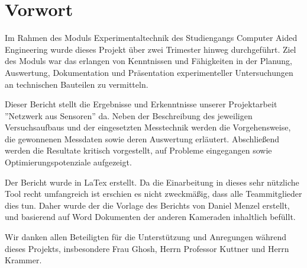 
\chapter*{Vorwort}
\thispagestyle{empty} %
\todo{}

Im Rahmen des Moduls Experimentaltechnik des Studiengangs Computer Aided Engineering wurde dieses Projekt über zwei Trimester hinweg durchgeführt.
Ziel des Moduls war das erlangen von Kenntnissen und Fähigkeiten in der Planung, Auswertung, Dokumentation und Präsentation experimenteller Untersuchungen an technischen Bauteilen zu vermitteln.

Dieser Bericht stellt die Ergebnisse und Erkenntnisse unserer Projektarbeit ''Netzwerk aus Sensoren'' da.
Neben der Beschreibung des jeweiligen Versuchsaufbaus und der eingesetzten Messtechnik  werden die Vorgehensweise, die gewonnenen Messdaten sowie deren Auswertung erläutert. Abschließend werden die Resultate kritisch vorgestellt, auf Probleme eingegangen sowie Optimierungspotenziale aufgezeigt.

Der Bericht wurde in LaTex erstellt. Da die Einarbeitung in dieses sehr nützliche Tool recht umfangreich ist erschien es nicht zweckmäßig, dass alle Teammitglieder dies tun.
Daher wurde der die Vorlage des Berichts von Daniel Menzel erstellt, und basierend auf Word Dokumenten der anderen Kameraden inhaltlich befüllt.

Wir danken allen Beteiligten für die Unterstützung und Anregungen während dieses Projekts, insbesondere Frau Ghosh, Herrn Professor Kuttner und Herrn Krammer.

